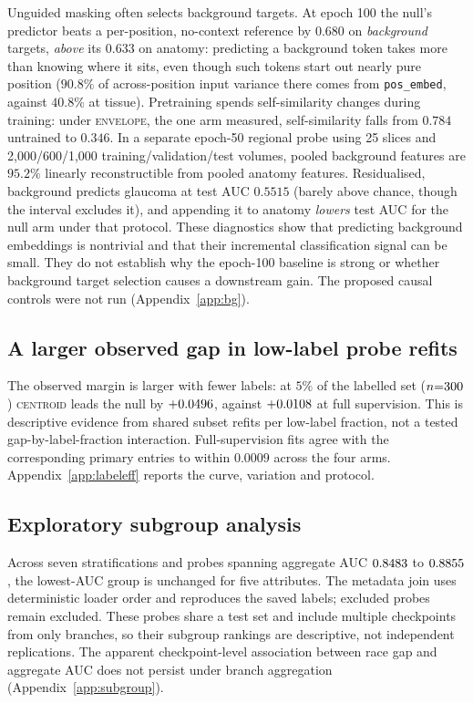 \documentclass{article}
\newcommand{\ArmBest}{\textsc{centroid}}
\begin{document}
Unguided masking often selects background targets. At epoch 100 the null's
predictor beats a per-position, no-context reference by $0.680$ on
\emph{background} targets, \emph{above} its $0.633$ on anatomy: predicting a
background token takes more than knowing where it sits, even though such tokens
start out nearly pure position ($90.8\%$ of across-position input variance there
comes from \texttt{pos\_embed}, against $40.8\%$ at tissue). Pretraining spends
self-similarity changes during training: under \textsc{envelope}, the one arm measured,
self-similarity falls from $0.784$ untrained to $0.346$.
In a separate epoch-50 regional probe using 25 slices and
2{,}000/600/1{,}000 training/validation/test volumes, pooled background features
are $95.2\%$ linearly reconstructible from pooled anatomy features.
Residualised, background
predicts glaucoma at test AUC $0.5515$ (barely above chance, though the
interval excludes it), and appending it to anatomy
\emph{lowers} test AUC for the null arm under that protocol. These diagnostics
show that predicting background embeddings is nontrivial and that their
incremental classification signal can be small. They do not establish why the
epoch-100 baseline is strong or whether background target selection causes a
downstream gain. The proposed causal controls were not run
(Appendix~\ref{app:bg}).

\subsection{A larger observed gap in low-label probe refits}
\label{sec:labeleff}

The observed margin is larger with fewer labels: at $5\%$ of the labelled set
($n{=}300$) \ArmBest{} leads the null by $+0.0496$, against
$+0.0108$ at full supervision. This is descriptive evidence from
\LERepeats{} shared subset refits per low-label fraction, not a tested
gap-by-label-fraction interaction. Full-supervision fits agree with the
corresponding primary entries to within $0.0009$ across the four arms.
Appendix~\ref{app:labeleff} reports the curve, variation and protocol.


\subsection{Exploratory subgroup analysis}
\label{sec:subgroup}

Across seven stratifications and \NprobesSub{} probes spanning aggregate AUC
$0.8483$ to $0.8855$, the lowest-AUC group is unchanged for five
attributes. The metadata join uses deterministic loader order and reproduces
the saved labels; excluded probes remain excluded. These probes share a test
set and include multiple checkpoints from only \NbranchesSub{} branches,
so their subgroup rankings are descriptive, not independent replications.
The apparent checkpoint-level association between race gap and aggregate AUC
does not persist under branch aggregation (Appendix~\ref{app:subgroup}).
\end{document}
